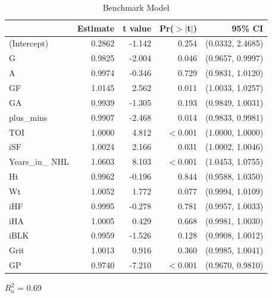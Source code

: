 \documentclass[10pt]{article}
\begin{document}
{{{{\begin{table}[tph]
\caption{Benchmark Model}
\label{tab:initial}
\centering
\begin{threeparttable}
\begin{tabular}[t]{lrrrr}
  \toprule
 & Estimate & t value & Pr($>$$|$t$|$) & 95\% CI \\ 
  \midrule
(Intercept) & 0.2862  & -1.142 & 0.254 & (0.0332, 2.4685) \\
  G & 0.9825 &  -2.004 & 0.046 & (0.9657, 0.9997) \\
  A & 0.9974 &  -0.346 & 0.729 & (0.9831, 1.0120) \\ 
  GF & 1.0145 &  2.562 & 0.011 & (1.0033, 1.0257) \\ 
  GA & 0.9939 & -1.305 & 0.193 & (0.9849, 1.0031) \\ 
  plus\_mins & 0.9907 &  -2.468 & 0.014 & (0.9833, 0.9981) \\ 
  TOI & 1.0000 &  4.812 &  $<$0.001 & (1.0000, 1.0000) \\
  iSF & 1.0024 & 2.166 & 0.031 & (1.0002, 1.0046) \\ 
  Years\_in\_ NHL & 1.0603 & 8.103 &  $<$0.001 & (1.0453, 1.0755) \\
  Ht & 0.9962 &  -0.196 & 0.844 & (0.9588, 1.0350) \\ 
  Wt & 1.0052  & 1.772 & 0.077 & (0.9994, 1.0109) \\ 
  iHF & 0.9995  & -0.278 & 0.781 & (0.9957, 1.0033) \\ 
  iHA & 1.0005  & 0.429 & 0.668 & (0.9981, 1.0030) \\ 
  iBLK & 0.9959  & -1.526 & 0.128 & (0.9908, 1.0012) \\ 
  Grit & 1.0013  & 0.916 & 0.360 & (0.9985, 1.0041) \\ 
  GP & 0.9740 & -7.210 & $<$0.001 &  (0.9670, 0.9810) \\ 
   \bottomrule
\end{tabular}
    \begin{tablenotes}
      \item $R^2_a$ = 0.69
    \end{tablenotes}
  \end{threeparttable} 
\end{table}

}}}}
\end{document}
